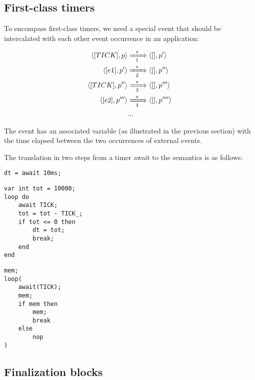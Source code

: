 \subsection{First-class timers}

To encompass first-class timers, we need a special  event that 
should be intercalated with each other event occurrence in an application:

\begin{align*}
\langle [TICK], p \rangle
    & \xRightarrow[~~1~~]{*}
\langle [    ], p' \rangle
\\
\langle [e1], p' \rangle
    & \xRightarrow[~~2~~]{*}
\langle [  ], p'' \rangle
\\
\langle [TICK], p'' \rangle
    & \xRightarrow[~~3~~]{*}
\langle [    ], p''' \rangle
\\
\langle [e2], p''' \rangle
    & \xRightarrow[~~4~~]{*}
\langle [  ], p'''' \rangle
\\
& ...
\end{align*}

The  event has an associated variable  (as illustrated 
in the previous section) with the time elapsed between the two occurrences of 
external events.

The translation in two steps from a timer await to the semantics is as follows:

\noindent
\begin{minipage}[t]{0.30\linewidth}
\begin{lstlisting}
dt = await 10ms;
\end{lstlisting}
\end{minipage}
%
\begin{minipage}[t]{0.37\linewidth}
\begin{lstlisting}
var int tot = 10000;
loop do
    await TICK;
    tot = tot - TICK_;
    if tot <= 0 then
        dt = tot;
        break;
    end
end
\end{lstlisting}
\end{minipage}
%
\begin{minipage}[t]{0.30\linewidth}
\begin{lstlisting}
mem;
loop(
    await(TICK);
    mem;
    if mem then
        mem;
        break
    else
        nop
)
\end{lstlisting}
\end{minipage}

\subsection{Finalization blocks}
\label{sec.formal.fins}

